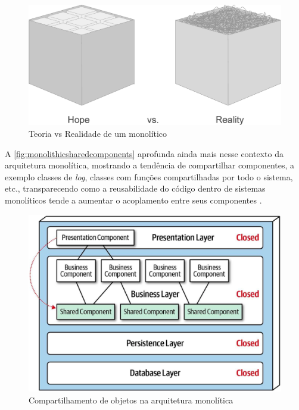 \begin{figure}[h]
  \centering
  \includegraphics[keepaspectratio=true,scale=0.4]{figuras/monolith-theory-practice.eps}
  \caption{Teoria vs Realidade de um monolítico\label{fig:monolithicInPractice} }
\end{figure}

A \autoref{fig:monolithicsharedcomponents} aprofunda ainda mais nesse contexto da arquitetura
monolítica, mostrando a tendência de compartilhar componentes, a exemplo classes de \textit{log},
classes com funções compartilhadas por todo o sistema, etc., transparecendo como a reusabilidade do
código dentro de sistemas monolíticos tende a aumentar o acoplamento entre seus componentes
\cite{Richards2020:FundamentalsOfSoftwareArchitecture}.

\begin{figure}[h]
  \centering
  \includegraphics[keepaspectratio=true,scale=0.4]{figuras/mono-shared-components.eps}
    \caption{Compartilhamento de objetos na arquitetura monolítica
    \label{fig:monolithicsharedcomponents} }
\end{figure}

